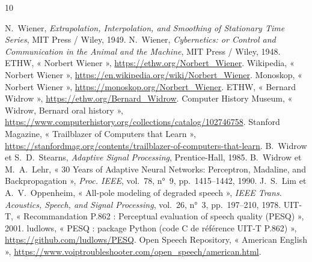 \begin{thebibliography}{10}
 N.~Wiener, \emph{Extrapolation, Interpolation, and Smoothing of Stationary Time Series}, MIT Press / Wiley, 1949.
 N.~Wiener, \emph{Cybernetics: or Control and Communication in the Animal and the Machine}, MIT Press / Wiley, 1948.
 ETHW, « Norbert Wiener », \url{https://ethw.org/Norbert_Wiener}.
 Wikipedia, « Norbert Wiener », \url{https://en.wikipedia.org/wiki/Norbert_Wiener}.
 Monoskop, « Norbert Wiener », \url{https://monoskop.org/Norbert_Wiener}.
 ETHW, « Bernard Widrow », \url{https://ethw.org/Bernard_Widrow}.
 Computer History Museum, « Widrow, Bernard oral history », \url{https://www.computerhistory.org/collections/catalog/102746758}.
 Stanford Magazine, « Trailblazer of Computers that Learn », \url{https://stanfordmag.org/contents/trailblazer-of-computers-that-learn}.
 B.~Widrow et S.~D.~Stearns, \emph{Adaptive Signal Processing}, Prentice-Hall, 1985.
 B.~Widrow et M.~A.~Lehr, « 30 Years of Adaptive Neural Networks: Perceptron, Madaline, and Backpropagation », \emph{Proc. IEEE}, vol.~78, n°~9, pp.~1415--1442, 1990.
 J.~S.~Lim et A.~V.~Oppenheim, « All-pole modeling of degraded speech », \emph{IEEE Trans. Acoustics, Speech, and Signal Processing}, vol.~26, n°~3, pp.~197--210, 1978.
 UIT-T, « Recommandation P.862 : Perceptual evaluation of speech quality (PESQ) », 2001.
 ludlows, « PESQ : package Python (code C de référence UIT-T P.862) », \url{https://github.com/ludlows/PESQ}.
 Open Speech Repository, « American English », \url{https://www.voiptroubleshooter.com/open_speech/american.html}.
\end{thebibliography}
